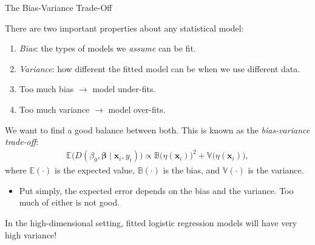 \documentclass[8pt]{beamer}
\newcommand{\mys}{\vspace{0.5cm} %
}
\begin{document}
\begin{frame}{\color{white} The Bias-Variance Trade-Off}

There are two important properties about any statistical model:
\begin{enumerate}
    \item \textit{Bias}: the types of models we \textit{assume} can be fit.
    \item \textit{Variance}: how different the fitted model can be when we use different data.
    \item Too much bias $\to$ model under-fits.
    \item Too much variance $\to$ model over-fits.
\end{enumerate} \mys

We want to find a good balance between both. This is known as the \textit{bias-variance trade-off}:
\begin{align*}
    \mathbb{E}\Big(D(\beta_0, \bm{\beta} \mid \bm{x}_i, y_i)\Big) \propto \mathbb{B}\big(\eta(\bm{x}_i) \big)^2 + \mathbb{V}\big(\eta(\bm{x}_i) \big),
\end{align*}
where $\mathbb{E}(\cdot)$ is the expected value, $\mathbb{B}(\cdot)$ is the bias, and $\mathbb{V}(\cdot)$ is the variance. 
\begin{itemize}
    \item Put simply, the expected error depends on the bias and the variance. Too much of either is not good.
\end{itemize}\mys

In the high-dimensional setting, fitted logistic regression models will have very high variance! \Sadey[1.5][yellow]
    
\end{frame}
\end{document}

